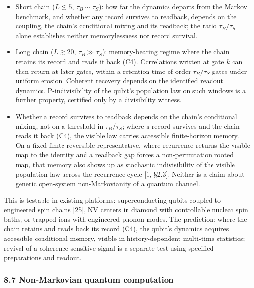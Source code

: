 \documentclass[
]{article}
\providecommand{\tightlist}{%
  \setlength{\itemsep}{0pt}\setlength{\parskip}{0pt}}
\begin{document}
\begin{itemize}
\tightlist
\item
  Short chain (\(L \lesssim 5\), \(\tau_B \sim \tau_S\)): how far the
  dynamics departs from the Markov benchmark, and whether any record
  survives to readback, depends on the coupling, the chain's conditional
  mixing and its readback; the ratio \(\tau_B/\tau_S\) alone establishes
  neither memorylessness nor record survival.
\item
  Long chain (\(L \gtrsim 20\), \(\tau_B \gg \tau_S\)): memory-bearing
  regime where the chain retains its record and reads it back (C4).
  Correlations written at gate \(k\) can then return at later gates,
  within a retention time of order \(\tau_B / \tau_S\) gates under
  uniform erosion. Coherent recovery depends on the identified readout
  dynamics. P-indivisibility of the qubit's population law on such
  windows is a further property, certified only by a divisibility
  witness.
\item
  Whether a record survives to readback depends on the chain's
  conditional mixing, not on a threshold in \(\tau_B / \tau_S\); where a
  record survives and the chain reads it back (C4), the visible law
  carries accessible finite-horizon memory. On a fixed finite reversible
  representative, where recurrence returns the visible map to the
  identity and a readback gap forces a non-permutation rooted map, that
  memory also shows up as stochastic indivisibility of the visible
  population law across the recurrence cycle {[}1, §2.3{]}. Neither is a
  claim about generic open-system non-Markovianity of a quantum channel.
\end{itemize}

This is testable in existing platforms: superconducting qubits coupled
to engineered spin chains {[}25{]}, NV centers in diamond with
controllable nuclear spin baths, or trapped ions with engineered phonon
modes. The prediction: where the chain retains and reads back its record
(C4), the qubit's dynamics acquires accessible conditional memory,
visible in history-dependent multi-time statistics; revival of a
coherence-sensitive signal is a separate test using specified
preparations and readout.

\hypertarget{non-markovian-quantum-computation}{%
\subsubsection{8.7 Non-Markovian quantum
computation}\label{non-markovian-quantum-computation}}
\end{document}
